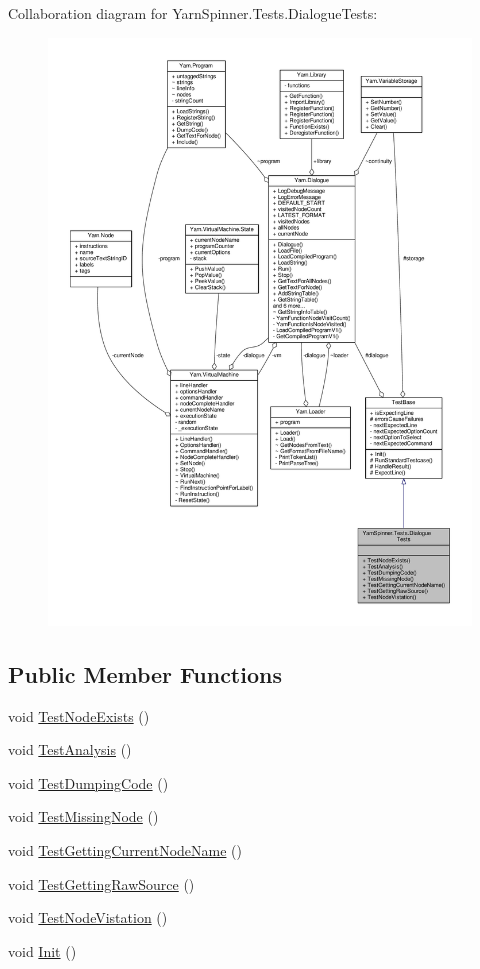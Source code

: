 Collaboration diagram for Yarn\-Spinner.\-Tests.\-Dialogue\-Tests\-:
\nopagebreak
\begin{figure}[H]
\begin{center}
\leavevmode
\includegraphics[width=350pt]{df/d3b/a00728}
\end{center}
\end{figure}
\subsection*{Public Member Functions}
\begin{DoxyCompactItemize}
\item 
void \hyperlink{a00072_a9d4171827bf3eba4c6ae52760a475f45}{Test\-Node\-Exists} ()
\item 
void \hyperlink{a00072_a40b0efb3cac1715b44640c29988139f1}{Test\-Analysis} ()
\item 
void \hyperlink{a00072_a111f0f8418baaeaf83cfb422c90210e0}{Test\-Dumping\-Code} ()
\item 
void \hyperlink{a00072_a013d5e3847b9d716b39aa925d70b99fd}{Test\-Missing\-Node} ()
\item 
void \hyperlink{a00072_afbb342ea64e33ee19d42a6a2c949592a}{Test\-Getting\-Current\-Node\-Name} ()
\item 
void \hyperlink{a00072_a16ed34de323da529e1a17670f556791c}{Test\-Getting\-Raw\-Source} ()
\item 
void \hyperlink{a00072_a9c0d2732044b273929dbce35358a1906}{Test\-Node\-Vistation} ()
\item 
void \hyperlink{a00144_a357a0dab579f9e45666c10779683dc27}{Init} ()
\end{DoxyCompactItemize}
